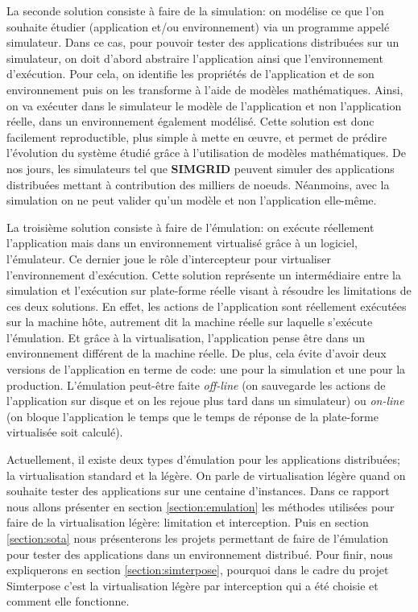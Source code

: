La seconde solution consiste à faire de la simulation: on modélise ce que l'on
souhaite étudier (application et/ou environnement) via un programme appelé
simulateur. Dans ce cas, pour pouvoir tester des applications distribuées sur un
simulateur, on doit d'abord abstraire l'application ainsi que l'environnement
d'exécution. Pour cela, on identifie les propriétés de l'application et de son
environnement puis on les transforme à l'aide de modèles mathématiques. Ainsi,
on va exécuter dans le simulateur le modèle de l'application et non
l'application réelle, dans un environnement également modélisé. Cette solution
est donc facilement reproductible, plus simple à mette en \oe uvre, et permet de
prédire l'évolution du système étudié grâce à l'utilisation de modèles
mathématiques. De nos jours, les simulateurs tel que
\textbf{SIMGRID}\citep{CASANOVA:SimGrid, MARTIN:SimGrid} peuvent simuler des
applications distribuées mettant à contribution des milliers de
noeuds. Néanmoins, avec la simulation on ne peut valider qu'un modèle et non
l'application elle-même.

La troisième solution consiste à faire de l'émulation: on exécute réellement
l'application mais dans un environnement virtualisé grâce à un logiciel,
l'émulateur. Ce dernier joue le rôle d'intercepteur pour virtualiser
l'environnement d'exécution.
Cette solution représente un intermédiaire entre la simulation et l'exécution
sur plate-forme réelle visant à résoudre les limitations de ces deux
solutions. En effet, les actions de l'application sont réellement exécutées sur
la machine hôte, autrement dit la machine réelle sur laquelle s'exécute
l'émulation. Et grâce à la virtualisation, l'application pense être dans un
environnement différent de la machine réelle. De plus, cela évite d'avoir deux
versions de l'application en terme de code: une pour la simulation et une pour
la production. L'émulation peut-être faite \textit{off-line} (on
sauvegarde les actions de l'application sur disque et on les rejoue plus tard
dans un simulateur) ou \textit{on-line} (on bloque l'application le temps que le temps de
réponse de la plate-forme virtualisée soit calculé).

Actuellement, il existe deux types d'émulation pour les applications
distribuées; la virtualisation standard et la légère. On parle de virtualisation
légère quand on souhaite tester des applications sur une centaine
d'instances. Dans ce rapport nous allons présenter en section
\ref{section:emulation} les méthodes utilisées pour faire de la virtualisation
légère: limitation et interception. Puis en section \ref{section:sota} nous
présenterons les projets permettant de faire de l'émulation pour tester des
applications dans un environnement distribué. Pour finir, nous expliquerons en
section \ref{section:simterpose}, pourquoi dans le cadre du projet Simterpose
c'est la virtualisation légère par interception qui a été choisie et comment
elle fonctionne.

